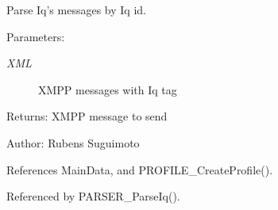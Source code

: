 Parse Iq's messages by Iq id. 

\begin{Desc}
\item[Parameters:]
\begin{description}
\item[{\em XML}]XMPP messages with Iq tag \end{description}
\end{Desc}
\begin{Desc}
\item[Returns:]XMPP message to send \end{Desc}
\begin{Desc}
\item[Author:]Rubens Suguimoto \end{Desc}


References MainData, and PROFILE\_\-CreateProfile().

Referenced by PARSER\_\-ParseIq().